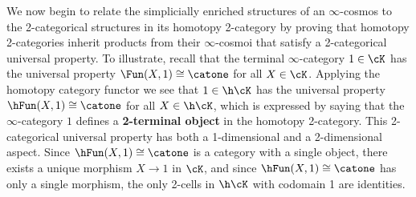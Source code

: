 
  We now begin to relate the simplicially enriched structures of an $\infty$-cosmos to the 2-cat\-e\-go\-ri\-cal structures in its homotopy 2-category by proving that homotopy 2-categories inherit products from their $\infty$-cosmoi that satisfy a 2-cat\-e\-go\-ri\-cal universal property. To illustrate, recall that the terminal $\infty$-category $1 \in \cK$ has the universal property $\Fun(X,1) \cong \catone$ for all $X \in \cK$. Applying the homotopy category functor we see that $1 \in \h\cK$ has the universal property $\hFun(X,1) \cong \catone$ for all $X \in \h\cK$, which is expressed by saying that the $\infty$-category $1$ defines a \textbf{2-terminal object} in the homotopy 2-category. This 2-categorical universal property has both a 1-dimensional and a 2-dimensional aspect. Since $\hFun(X,1)\cong \catone$ is a category with a single object, there exists a unique morphism $X \to 1$ in $\cK$, and since $\hFun(X,1)\cong\catone$ has only a single morphism,  the only 2-cells in $\h\cK$ with codomain 1 are identities.

